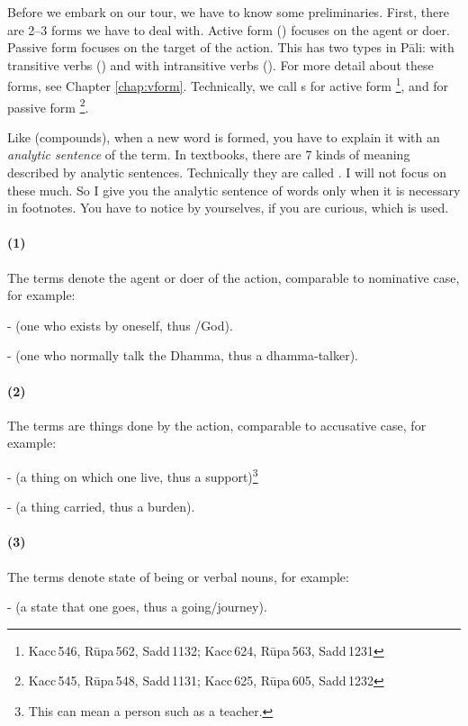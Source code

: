 Before we embark on our tour, we have to know some preliminaries. First, there are 2--3 forms we have to deal with. Active form () focuses on the agent or doer. Passive form focuses on the target of the action. This has two types in P\=ali: with transitive verbs () and with intransitive verbs (). For more detail about these forms, see Chapter \ref{chap:vform}. Technically, we call s for active form \footnote{Kacc\,546, R\=upa\,562, Sadd\,1132; Kacc\,624, R\=upa\,563, Sadd\,1231}, and for passive form \footnote{Kacc\,545, R\=upa\,548, Sadd\,1131; Kacc\,625, R\=upa\,605, Sadd\,1232}.

Like  (compounds), when a new word is formed, you have to explain it with an \emph{analytic sentence} of the term. In textbooks, there are 7 kinds of meaning described by analytic sentences. Technically they are called . I will not focus on these much. So I give you the analytic sentence of words only when it is necessary in footnotes. You have to notice by yourselves, if you are curious, which  is used.

\paragraph*{(1) } The terms denote the agent or doer of the action, comparable to nominative case, for example:\par
-  (one who exists by oneself, thus /God).\par
-  (one who normally talk the Dhamma, thus a dhamma-talker).\par

\paragraph*{(2) } The terms are things done by the action, comparable to accusative case, for example:\par
-  (a thing on which one live, thus a support)\footnote{This can mean a person such as a teacher.}\par
-  (a thing carried, thus a burden).\par

\paragraph*{(3) } The terms denote state of being or verbal nouns, for example:\par
-  (a state that one goes, thus a going/journey).\par

